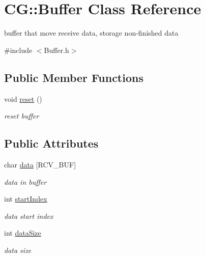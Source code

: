 \hypertarget{class_c_g_1_1_buffer}{}\section{CG\+:\+:Buffer Class Reference}
\label{class_c_g_1_1_buffer}


buffer that move receive data, storage non-\/finished data  




{\ttfamily \#include $<$Buffer.\+h$>$}

\subsection*{Public Member Functions}
\begin{DoxyCompactItemize}
\item 
\mbox{\label{class_c_g_1_1_buffer_a1e06b035a494ef3788bffe96a97e19eb}} 
void \mbox{\hyperlink{class_c_g_1_1_buffer_a1e06b035a494ef3788bffe96a97e19eb}{reset}} ()
\begin{DoxyCompactList}\small\item\em reset buffer \end{DoxyCompactList}\end{DoxyCompactItemize}
\subsection*{Public Attributes}
\begin{DoxyCompactItemize}
\item 
\mbox{\label{class_c_g_1_1_buffer_a83f061df0766efbb8c8dd18ec663a021}} 
char \mbox{\hyperlink{class_c_g_1_1_buffer_a83f061df0766efbb8c8dd18ec663a021}{data}} \mbox{[}R\+C\+V\+\_\+\+B\+UF\mbox{]}
\begin{DoxyCompactList}\small\item\em data in buffer \end{DoxyCompactList}\item 
\mbox{\label{class_c_g_1_1_buffer_a6db7caf87fb31fcfabbf96eca2b3016c}} 
int \mbox{\hyperlink{class_c_g_1_1_buffer_a6db7caf87fb31fcfabbf96eca2b3016c}{start\+Index}}
\begin{DoxyCompactList}\small\item\em data start index \end{DoxyCompactList}\item 
\mbox{\label{class_c_g_1_1_buffer_a037dfe4011fff334709dd66e8809a8b5}} 
int \mbox{\hyperlink{class_c_g_1_1_buffer_a037dfe4011fff334709dd66e8809a8b5}{data\+Size}}
\begin{DoxyCompactList}\small\item\em data size \end{DoxyCompactList}\end{DoxyCompactItemize}


